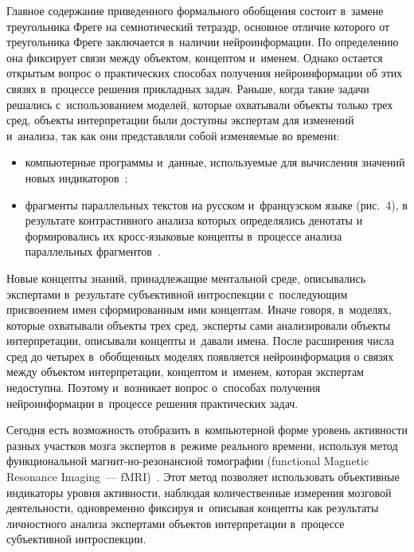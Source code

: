 {\begin{multicols}{2}
      Главное содержание приведенного формального обобщения состоит в~замене 
треугольника Фреге на семиотический тетраэдр, основное отличие которого от 
треугольника Фреге заключается в~наличии нейроинформации. По определению она 
фиксирует связи между объектом, концептом и~именем. Однако остается открытым вопрос 
о практических способах получения нейроинформации об этих связях в~процессе решения 
прикладных задач. Раньше, когда такие задачи решались с~использованием моделей, 
которые охватывали объекты только трех сред, объекты интерпретации были доступны 
экспертам для изменений и~анализа, так как они представляли собой изменяемые во 
времени:
      \begin{itemize}
\item компьютерные программы и~данные, используемые для вычисления 
значений новых индикаторов~\cite{9-zat, 23-zat};
\item фрагменты параллельных текстов на русском и~французском языке (рис.~4), 
в результате контрастивного анализа которых определялись денотаты и~
формировались их кросс-язы\-ко\-вые концепты в~процессе анализа 
параллельных фрагментов~\cite{24-zat, 25-zat}.
      \end{itemize}
      
      Новые концепты знаний, принадлежащие ментальной среде, описывались 
экспертами в~результате субъективной интроспекции с~последующим присвоением имен 
сформированным ими концептам. Иначе говоря, в~моделях, которые охватывали объекты 
трех сред, эксперты сами анализировали объекты интерпретации, описывали концепты 
и~давали имена. После расширения числа сред до четырех в~обобщенных моделях появляется 
нейроинформация о связях между объектом интерпретации, концептом и~именем, которая 
экспертам недоступна. Поэтому и~возникает вопрос о~способах получения 
нейроинформации в~процессе решения практических задач.
      
      Сегодня есть возможность отобразить в~компьютерной форме уровень активности 
разных участ\-ков мозга экспертов в~режиме реального времени, используя метод 
функциональной маг\-нит-\linebreak но-ре\-зо\-нанс\-ной томографии (functional Magnetic Resonance 
Imaging~--- fMRI)~\cite{26-zat}. Этот метод позволяет использовать объективные 
индикаторы уровня активности, наблюдая количественные измерения мозговой 
деятельности, одновременно фиксируя и~описывая концепты как результаты личностного 
анализа экспертами объектов интерпретации в~процессе субъективной интроспекции.
      

\end{multicols}}
